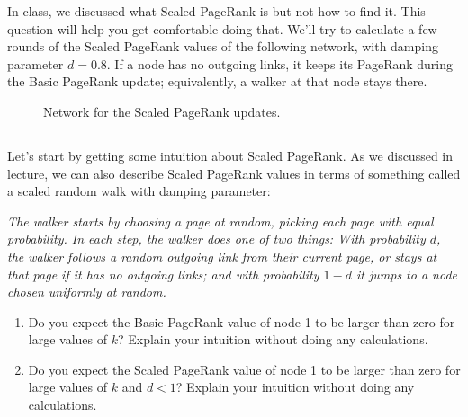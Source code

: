 \documentclass[newpages]{assignment}
\begin{document}
\begin{problem}
    In class, we discussed what Scaled PageRank is but not how to find it. This question will help you get comfortable doing that. We'll try to calculate a few rounds of the Scaled PageRank values of the following network, with damping parameter \(d=0.8\).
    If a node has no outgoing links, it keeps its PageRank during the Basic PageRank update; equivalently, a walker at that node stays there.

    \begin{figure}[H]
        \centering
        \caption{Network for the Scaled PageRank updates.}
        \label{fig:hw8-pagerank}
    \end{figure}
\end{problem}

\subsection{}

\begin{problem}
    Let's start by getting some intuition about Scaled PageRank. As we discussed in lecture, we can also describe Scaled PageRank values in terms of something called a scaled random walk with damping parameter:

    \emph{The walker starts by choosing a page at random, picking each page with equal probability. In each step, the walker does one of two things: With probability \(d\), the walker follows a random outgoing link from their current page, or stays at that page if it has no outgoing links; and with probability \(1-d\) it jumps to a node chosen uniformly at random.}

    \begin{enumerate}[label=\roman*.]
        \item Do you expect the Basic PageRank value of node 1 to be larger than zero for large values of \(k\)? Explain your intuition without doing any calculations.
        \item Do you expect the Scaled PageRank value of node 1 to be larger than zero for large values of \(k\) and \(d<1\)? Explain your intuition without doing any calculations.
    \end{enumerate}
\end{problem}
\end{document}
